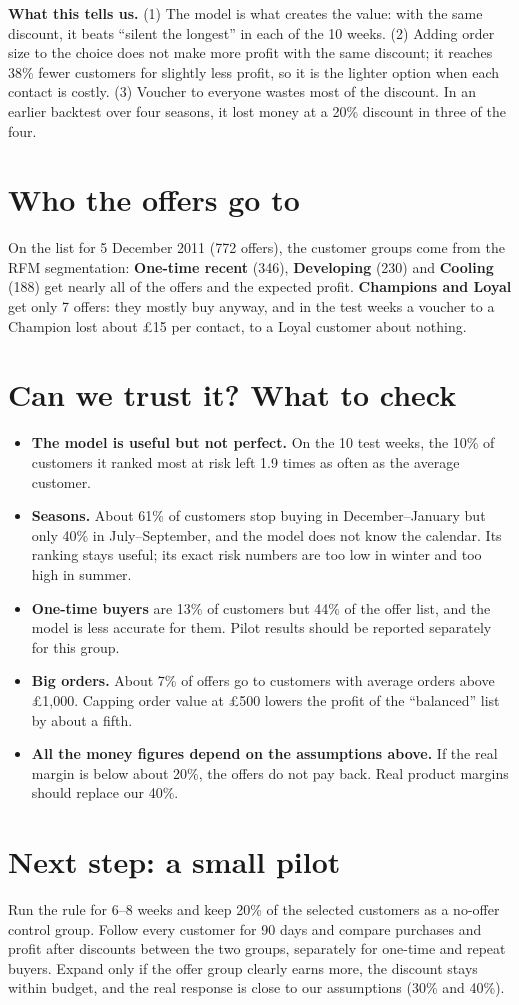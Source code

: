 \documentclass[a4paper,10pt]{article}
\begin{document}
\textbf{What this tells us.} (1) The model is what creates the value: with the same discount, it beats ``silent the longest'' in each of the 10 weeks. (2) Adding order size to the choice does not make more profit with the same discount; it reaches 38\% fewer customers for slightly less profit, so it is the lighter option when each contact is costly. (3) Voucher to everyone wastes most of the discount. In an earlier backtest over four seasons, it lost money at a 20\% discount in three of the four.

\section*{Who the offers go to}
On the list for 5 December 2011 (772 offers), the customer groups come from the RFM segmentation: \textbf{One-time recent} (346), \textbf{Developing} (230) and \textbf{Cooling} (188) get nearly all of the offers and the expected profit. \textbf{Champions and Loyal} get only 7 offers: they mostly buy anyway, and in the test weeks a voucher to a Champion lost about \pounds15 per contact, to a Loyal customer about nothing.

\section*{Can we trust it? What to check}
\begin{itemize}[leftmargin=1.2em,itemsep=0.1em,topsep=0.2em]
\item \textbf{The model is useful but not perfect.} On the 10 test weeks, the 10\% of customers it ranked most at risk left 1.9 times as often as the average customer.
\item \textbf{Seasons.} About 61\% of customers stop buying in December--January but only 40\% in July--September, and the model does not know the calendar. Its ranking stays useful; its exact risk numbers are too low in winter and too high in summer.
\item \textbf{One-time buyers} are 13\% of customers but 44\% of the offer list, and the model is less accurate for them. Pilot results should be reported separately for this group.
\item \textbf{Big orders.} About 7\% of offers go to customers with average orders above \pounds1,000. Capping order value at \pounds500 lowers the profit of the ``balanced'' list by about a fifth.
\item \textbf{All the money figures depend on the assumptions above.} If the real margin is below about 20\%, the offers do not pay back. Real product margins should replace our 40\%.
\end{itemize}

\section*{Next step: a small pilot}
Run the rule for 6--8 weeks and keep 20\% of the selected customers as a no-offer control group. Follow every customer for 90 days and compare purchases and profit after discounts between the two groups, separately for one-time and repeat buyers. Expand only if the offer group clearly earns more, the discount stays within budget, and the real response is close to our assumptions (30\% and 40\%).
\end{document}
